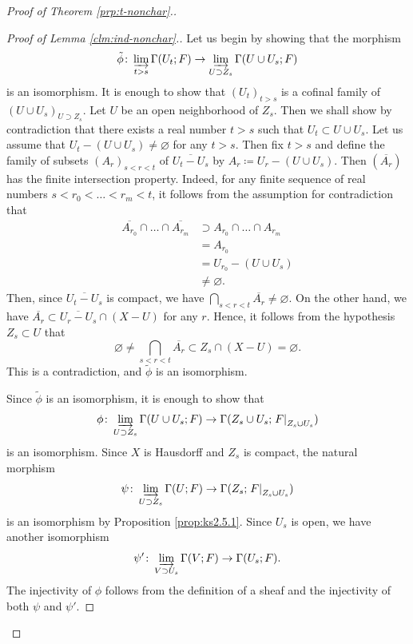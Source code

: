 \begin{proof}[{Proof of Theorem \ref{prp:t-nonchar}.}]
\begin{proof}[Proof of Lemma \ref{clm:ind-nonchar}.]
    Let us begin by showing that the morphism  
    \[
      \tilde{\phi}\colon\indlim[t>s]
      \Gamma(U_{t};F)
      \to 
      \indlim[U\supset Z_{s}]
      \Gamma(U\cup U_{s};F) 
    \]
    is an isomorphism. 
    It is enough to show that \(
      \left(U_{t}\right)_{t>s}
    \) is a cofinal family of \((U\cup U_{s})_{U\supset Z_{s}}\). 
    Let \(U\) be an open neighborhood of \(Z_{s}\). 
    Then we shall show by contradiction that 
    there exists a real number \(t>s\) such that 
    \(U_{t}\subset U\cup U_{s}\). 
    Let us assume that 
    \(U_{t}-(U\cup U_{s})\ne \varnothing\) 
    for any \(t>s\). 
    Then fix \(t>s\) and define the family of subsets \(
      \left(A_{r}\right)_{s<r<t}
    \) of \(\overline{U_{t}- U_{s}}\) by \(
      A_{r}\coloneqq U_{r}- (U\cup U_{s})
    \). 
    Then \(\left(\overline{A_{r}}\right)\) has 
    the finite intersection property. 
    Indeed,
    for any finite sequence of 
    real numbers \(s<r_{0}<\dots<r_{m}<t\), 
    it follows from 
    the assumption for contradiction
    that
    \begin{align*}
      \overline{A_{r_{0}}}\cap \dots \cap \overline{A_{r_{m}}}
      &\supset A_{r_{0}}\cap \dots \cap A_{r_{m}}\\
      &= A_{r_{0}}\\
      &= U_{r_{0}}- (U\cup U_{s})\\
      &\ne \varnothing.
    \end{align*}
    Then, since
    \(\overline{U_{t}- U_{s}}\) is 
    compact, 
    we have \(\bigcap_{s<r<t}\overline{A_{r}}\ne\varnothing\).
    On the other hand, 
    we have \(
      \overline{A_{r}}
      \subset 
      \overline{U_{r}- U_{s}}\cap (X-U)
    \) for any \(r\). 
    Hence, 
    it follows from the hypothesis \(Z_{s}\subset U\) that 
    \[
      \varnothing 
      \ne
      \bigcap_{s<r<t}\overline{A_{r}}
      \subset 
      Z_{s}\cap (X- U)
      =\varnothing. 
    \]
    This is a contradiction, 
    and \(\tilde{\phi}\) is an isomorphism. 

    Since \(\tilde{\phi}\) is an isomorphism, 
    it is enough to show that
    \begin{equation}\label{eq:isom-union}
      \phi\colon\indlim[U\supset Z_{s}]
      \Gamma(U\cup U_{s};F)
      \to
      \Gamma(Z_{s}\cup U_{s};\mres[F]{Z_{s}\cup U_{s}})    
    \end{equation}
    is an isomorphism.     
    Since \(X\) is Hausdorff and \(Z_{s}\) is compact, 
    the natural morphism 
    \[
      \psi\colon\indlim[U\supset Z_{s}]\Gamma(U;F)
      \to
      \Gamma(Z_{s};\mres[F]{Z_{s}\cup U_{s}})
    \]
    is an isomorphism by Proposition \ref{prop:ks2.5.1}. 
    Since \(U_{s}\) is open, we have another isomorphism 
    \[
      \psi'\colon\indlim[V\supset U_{s}]\Gamma(V;F)
      \to
      \Gamma(U_{s};F).
    \] 
    The injectivity of \(\phi\) follows from 
    the definition of a sheaf 
    and the injectivity of both \(\psi\) and \(\psi'\). 


\end{proof}
\end{proof}
